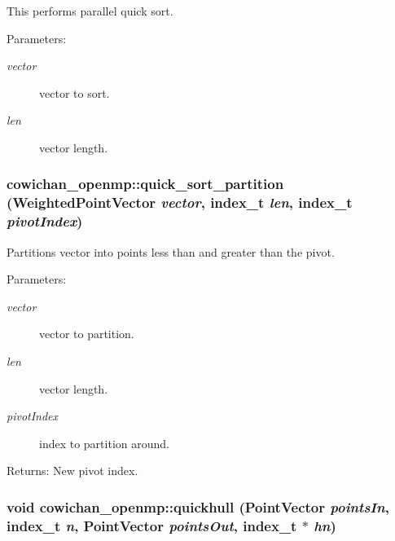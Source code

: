 This performs parallel quick sort. \begin{Desc}
\item[Parameters:]
\begin{description}
\item[{\em vector}]vector to sort. \item[{\em len}]vector length. \end{description}
\end{Desc}
\hypertarget{namespacecowichan__openmp_2733c307de545e237e020a1f166850c5}{
\subsubsection[{quick\_\-sort\_\-partition}]{ cowichan\_\-openmp::quick\_\-sort\_\-partition ({\bf WeightedPointVector} {\em vector}, \/  {\bf index\_\-t} {\em len}, \/  {\bf index\_\-t} {\em pivotIndex})}}
\label{namespacecowichan__openmp_2733c307de545e237e020a1f166850c5}


Partitions vector into points less than and greater than the pivot. \begin{Desc}
\item[Parameters:]
\begin{description}
\item[{\em vector}]vector to partition. \item[{\em len}]vector length. \item[{\em pivotIndex}]index to partition around. \end{description}
\end{Desc}
\begin{Desc}
\item[Returns:]New pivot index. \end{Desc}
\hypertarget{namespacecowichan__openmp_f261011870b201d556308f43b5b25b89}{
\subsubsection[{quickhull}]{\setlength{\rightskip}{0pt plus 5cm}void cowichan\_\-openmp::quickhull ({\bf PointVector} {\em pointsIn}, \/  {\bf index\_\-t} {\em n}, \/  {\bf PointVector} {\em pointsOut}, \/  {\bf index\_\-t} $\ast$ {\em hn})}}
\label{namespacecowichan__openmp_f261011870b201d556308f43b5b25b89}


